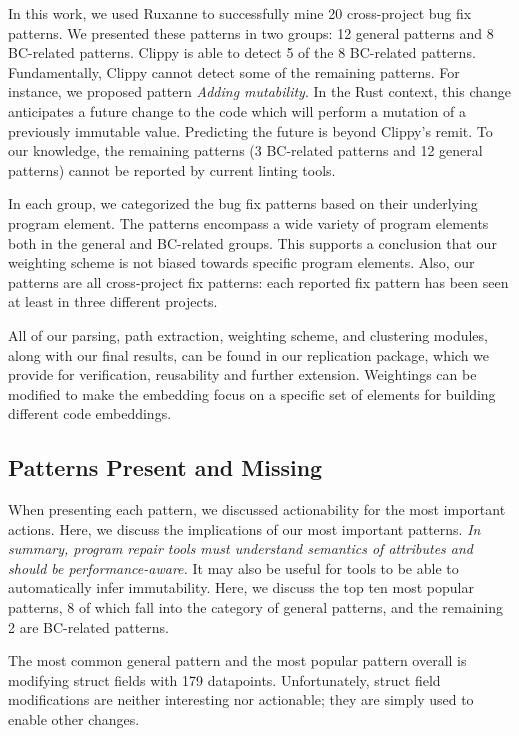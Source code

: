 In this work, we used Ruxanne to successfully mine 20 cross-project bug fix patterns. We presented these patterns in two groups: 12 general patterns and 8 BC-related patterns. Clippy is able to detect 5 of the 8 BC-related patterns. Fundamentally, Clippy cannot detect some of the remaining patterns. For instance, we proposed pattern \textit{Adding mutability}. In the Rust context, this change anticipates a future change to the code which will perform a mutation of a previously immutable value. Predicting the future is beyond Clippy's remit. To our knowledge, the remaining patterns (3 BC-related patterns and 12 general patterns) cannot be reported by current linting tools. 

In each group, we categorized the bug fix patterns based on their underlying program element. The patterns encompass a wide variety of program elements both in the general and BC-related groups. This supports a conclusion that our weighting scheme is not biased towards specific program elements. Also, our patterns are all cross-project fix patterns: each reported fix pattern has been seen at least in three different projects.

All of our parsing, path extraction, weighting scheme, and clustering modules, along with our final results, can be found in our replication package, which we provide for verification, reusability and further extension. Weightings can be modified to make the embedding focus on a specific set of elements for building different code embeddings.

\subsection{Patterns Present and Missing}
\label{subsec:patterns}

When presenting each pattern, we discussed actionability for the most important actions. Here, we discuss the implications of our most important patterns. \emph{In summary, program repair tools must understand semantics of attributes and should be performance-aware.} It may also be useful for tools to be able to automatically infer immutability. Here, we discuss the top ten most popular patterns, 8 of which fall into the category of general patterns, and the remaining 2 are BC-related patterns.

The most common general pattern and the most popular pattern overall is modifying struct fields with 179 datapoints. Unfortunately, struct field modifications are neither interesting nor actionable; they are simply used to enable other changes. 

